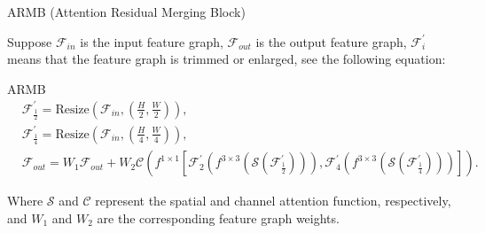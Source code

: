 \documentclass[CJK,aspectratio=169]{beamer}  %
\begin{document}
	\begin{frame}	
		
		ARMB (Attention Residual Merging Block) 
		
		
		Suppose $ \mathcal {F} _ {in} $ is the input feature graph, $ \mathcal {F} _ {out} $ is the output feature graph, $ \mathcal {F} _ {i} ^ \prime$ means that the feature graph is trimmed or enlarged, see the following equation:
		
		
		\begin{block}{ARMB}
			\begin{equation}
				\begin{aligned}
					&\mathcal{F}^\prime_{\frac{1}{2}} = \text{Resize}\left(\mathcal{F}_{in},\left(\frac{H}{2},\frac{W}{2}\right)\right), \\
					&\mathcal{F}^\prime_{\frac{1}{4}} = \text{Resize}\left(\mathcal{F}_{in},\left(\frac{H}{4},\frac{W}{4}\right)\right), \\
					&\mathcal{F}_{out} = W_1\mathcal{F}_{out} + W_2\mathcal{C} \left( f^{1 \times 1}  \left[\mathcal{F}^\prime_2 (f^{3 \times 3}(\mathcal{S}(\mathcal{F}^\prime_{\frac{1}{2}}))), \mathcal{F}^\prime_4 (f^{3 \times 3}(\mathcal{S}(\mathcal{F}^\prime_{\frac{1}{4}})))\right] \right).
				\end{aligned}
				\label{eq: ARMB}
			\end{equation}
		\end{block}
		
		Where $ \mathcal{S} $ and $ \mathcal{C} $ represent the spatial and channel attention function, respectively, and $W_1$ and $W_2$ are the corresponding feature graph weights.
		
	\end{frame}
	
\end{document}
